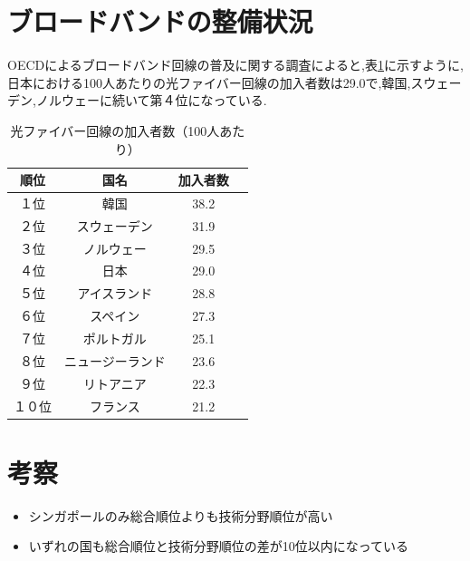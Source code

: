 \documentclass[a4paper,11pt,dvipdfmx]{ujarticle}
\begin{document}
\section{ブロードバンドの整備状況}
OECDによるブロードバンド回線の普及に関する調査\cite{imd}によると,表\ref{tbl:mytbl}に示すように,
日本における100人あたりの光ファイバー回線の加入者数は29.0で,韓国,スウェーデン,ノルウェーに続いて第４位になっている.
\begin{table}[htbp]
    \centering
    \caption{光ファイバー回線の加入者数（100人あたり）}\label{tbl:mytbl}
    \begin{tabular}{c|c|c|c}
        \hline
        順位 & 国名 & 加入者数 \\
        \hline
        １位 & 韓国 & 38.2 \\
        \hline
        ２位 & スウェーデン & 31.9 \\
        \hline
        ３位 & ノルウェー & 29.5 \\
        \hline
        ４位 & 日本 & 29.0 \\
        \hline
        ５位 & アイスランド & 28.8 \\
        \hline
        ６位 & スペイン & 27.3 \\
        \hline
        ７位 & ポルトガル & 25.1 \\
        \hline
        ８位 & ニュージーランド & 23.6 \\
        \hline
        ９位 & リトアニア & 22.3 \\
        \hline
        １０位 & フランス & 21.2 \\
    \end{tabular} 
\end{table}

\section{考察}
\begin{itemize}
    \item シンガポールのみ総合順位よりも技術分野順位が高い
    \item いずれの国も総合順位と技術分野順位の差が10位以内になっている
\end{itemize}
%

%


\end{document}
